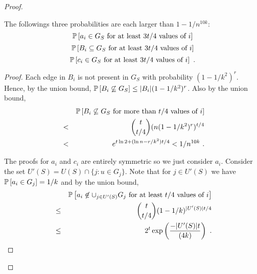 \begin{proof}
\begin{claim} The followings three probabilities are each larger than $1-1/n^{10k}$:
\[
\mathbb P \left [ a_i \in G_S \mbox{ for at least $3t/4$ values of $i$} \right ]\]
\[\mathbb P \left [ B_i \subseteq G_S \mbox{ for at least $3t/4$ values of $i$} \right ]\]
\[\mathbb P \left [ c_i \in G_S \mbox{ for at least $3t/4$ values of $i$} \right ] \ .
\]
%
\end{claim}
\begin{proof}
Each edge in $B_i$ is not present in $G_S$ with probability $(1-1/k^2)^{r}$. Hence, by the union bound,
$\mathbb P \left [ B_i\not \subseteq G_S \right ]\leq |B_i| (1-1/k^2)^{r}$.
Also by the union bound,
\begin{eqnarray*}
& & \mathbb P \left [ B_i \not \subseteq G_S \mbox{ for more than $t/4$ values of $i$} \right ]
\\ &<&   {t\choose t/4} (n (1-1/k^2)^{r})^{t/4} \\
&< &  e^{t \ln 2+(\ln n-r/k^2)t/4}<1/n^{10k} \ .
\end{eqnarray*}

The proofs for $a_i$ and $c_i$ are entirely symmetric so we just consider $a_i$. 
Consider the set $U'(S)=U(S)\cap \{j: u\in G_j\}$. Note that for $j\in U'(S)$ we have
$\mathbb P \left [ a_i\in G_j \right ]=1/k$ and by the union bound,
\begin{eqnarray*}
& & \mathbb P \left [ a_i\not \in \cup_{j\in U'(S)}G_j \mbox{ for at least $t/4$ values of $i$} \right ]\\
& \leq & {t \choose t/4} (1-1/k)^{|U'(S)|  t/4} \\
& \leq & 2^t \exp \left (\frac{-|U'(S)|  t}{(4k)}\right )
\ .
\end{eqnarray*}


\end{proof}
\end{proof}

